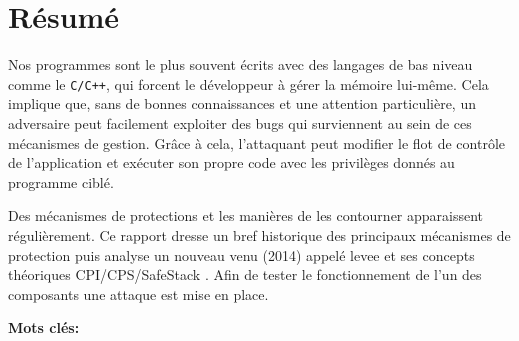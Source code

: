 
%
%


\chapter*{Résumé}

Nos programmes sont le plus souvent écrits avec des langages de bas niveau comme le \texttt{C/C++}, qui forcent le développeur à gérer la mémoire lui-même. Cela implique que, sans de bonnes connaissances et une attention particulière, un adversaire peut facilement exploiter des bugs qui surviennent au sein de ces mécanismes de gestion. Grâce à cela, l’attaquant peut modifier le flot de contrôle de l'application et exécuter son propre code avec les privilèges donnés au programme ciblé.

Des mécanismes de protections et les manières de les contourner apparaissent régulièrement. Ce rapport dresse un bref historique des principaux mécanismes de protection puis analyse un nouveau venu (2014) appelé \gls{levee} et ses concepts théoriques CPI/CPS/\og SafeStack \fg. Afin de tester le fonctionnement de l'un des composants une attaque est mise en place.

\vskip0.5cm
\noindent\textbf{Mots clés:}
\Keywordsfr
